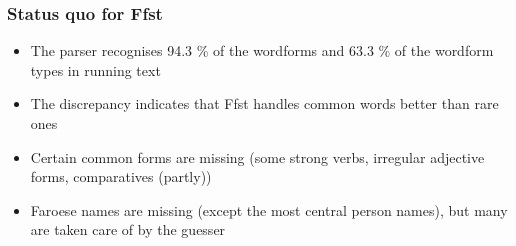 \documentclass{beamer}
\begin{document}



\begin{frame}
\frametitle{Status quo for Ffst}
\begin{itemize}
\item The parser recognises 94.3 \% of the wordforms and 63.3  \% of the wordform types in running text
\item The discrepancy indicates that Ffst handles common words better than rare ones
\item{Certain common forms are missing (some strong verbs, irregular adjective forms, comparatives (partly))}
\item{Faroese names are missing (except the most central person names), but many are taken care of by the guesser}
\end{itemize}
\end{frame}
\end{document}
